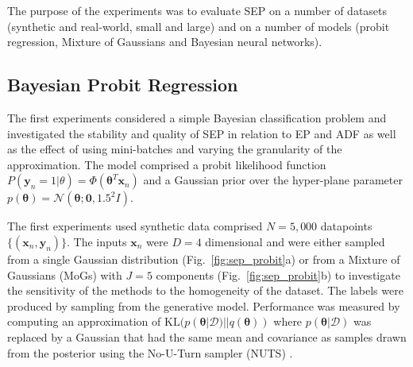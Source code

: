 
The purpose of the experiments was to evaluate SEP on a number of datasets (synthetic and real-world, small and large) and on a number of models (probit regression, Mixture of Gaussians and Bayesian neural networks).

\subsection{Bayesian Probit Regression}
%
The first experiments considered a simple Bayesian classification problem and investigated the stability and quality of SEP in relation to EP and ADF as well as the effect of using mini-batches and varying the granularity of the approximation. The model comprised a probit likelihood function $P(\bm{y}_n = 1|\theta) = \Phi(\bm{\theta}^T \bm{x}_n)$ and a Gaussian prior over the hyper-plane parameter  $p(\bm{\theta}) = \mathcal{N}(\bm{\theta}; \bm{0}, 1.5^2 I)$.  

The first experiments used synthetic data comprised $N=5,000$ datapoints $\{ (\bm{x}_n, \bm{y}_n) \}$. The inputs $\bm{x}_n$ were $D=4$ dimensional and were either sampled from a single Gaussian distribution (Fig.~\ref{fig:sep_probit}a) or from a Mixture of Gaussians (MoGs) with $J=5$ components (Fig.~\ref{fig:sep_probit}b) to investigate the sensitivity of the methods to the homogeneity of the dataset. The labels were produced by sampling from the generative model. Performance was measured by computing an approximation of $\mathrm{KL}(p(\bm{\theta}|\mathcal{D}) || q(\bm{\theta}))$ where $p(\bm{\theta}|\mathcal{D})$ was replaced by a Gaussian that had the same mean and covariance as samples drawn from the posterior using the No-U-Turn sampler (NUTS) \cite{hoffman:nuts}.


